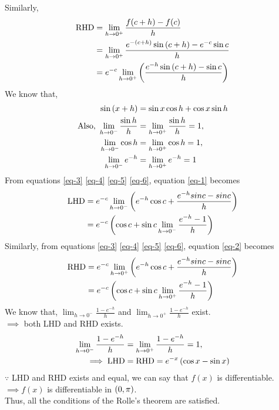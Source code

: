\documentclass[journal,12pt,twocolumn]{IEEEtran}
\begin{document}
Similarly,
\begin{align}
    \text{RHD} &= \lim_{h \to 0^{+}} \frac{f(c+h)-f(c)}{h}\\
    &= \lim_{h \to 0^{+}} \frac{e^{-\left(c+h\right)} \sin \left(c+h\right) - e^{-c} \sin c}{h}\\
    \label{eq-2}
    &= e^{-c} \lim_{h \to 0^{+}} \left(\frac{e^{-h} \sin \left(c+h\right) - \sin c}{h}\right)
\end{align}
We know that,
\begin{align}
    \label{eq-3}
    \sin \left(x+h\right) &= \sin x \cos h + \cos x \sin h\\
    \label{eq-4}
    \text{Also, } \lim_{h \to 0^{-}} \frac{\sin h}{h} &= \lim_{h \to 0^{+}} \frac{\sin h}{h} = 1,\\
    \label{eq-5}
    \lim_{h \to 0^{-}} \cos h &= \lim_{h \to 0^{+}} \cos h = 1,\\
    \label{eq-6}
    \lim_{h \to 0^{-}} e^{-h} &= \lim_{h \to 0^{+}} e^{-h} = 1
\end{align}
From equations \eqref{eq-3} \eqref{eq-4} \eqref{eq-5} \eqref{eq-6}, equation \eqref{eq-1} becomes
\begin{align}
    \text{LHD} &= e^{-c} \lim_{h \to 0^{-}} \left(e^{-h} \cos c +\frac{e^{-h}sinc - sinc}{h}\right)\\
    &= e^{-c} \left(\cos c + \sin c \lim_{h \to 0^{-}} \frac{e^{-h}-1}{h}\right)
\end{align}
Similarly, from equations \eqref{eq-3} \eqref{eq-4} \eqref{eq-5} \eqref{eq-6}, equation \eqref{eq-2} becomes
\begin{align}
    \text{RHD} &= e^{-c} \lim_{h \to 0^{+}} \left(e^{-h} \cos c +\frac{e^{-h}sinc - sinc}{h}\right)\\
    &= e^{-c} \left(\cos c + \sin c \lim_{h \to 0^{+}} \frac{e^{-h}-1}{h}\right)
\end{align}
We know that, $\lim_{h \to 0^{-}} \frac{1-e^{-h}}{h}$ and $\lim_{h \to 0^{+}} \frac{1-e^{-h}}{h}$ exist.\\
$\implies$ both LHD and RHD exists.
\begin{align}
    \lim_{h \to 0^{-}} \frac{1-e^{-h}}{h} &= \lim_{h \to 0^{+}} \frac{1-e^{-h}}{h} = 1,\\
    \implies \text{LHD} &= \text{RHD} = e^{-x} \left(\cos x - \sin x\right)
\end{align}
$\because$ LHD and RHD exists and equal, we can say that $f(x)$ is differentiable.\\
$\implies f(x)$ is differentiable in $\left(0,\pi\right)$.\\
Thus, all the conditions of the Rolle's theorem are satisfied.\\
\end{document}
